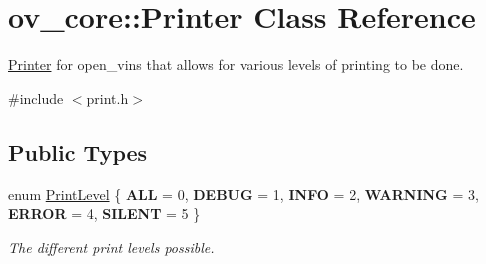 \hypertarget{classov__core_1_1Printer}{}\section{ov\+\_\+core\+:\+:Printer Class Reference}
\label{classov__core_1_1Printer}


\hyperlink{classov__core_1_1Printer}{Printer} for open\+\_\+vins that allows for various levels of printing to be done.  




{\ttfamily \#include $<$print.\+h$>$}

\subsection*{Public Types}
\begin{DoxyCompactItemize}
\item 
enum \hyperlink{classov__core_1_1Printer_a1c4c6c612ec6251afd91a1ddf933a0b2}{Print\+Level} \{ \newline
{\bfseries A\+LL} = 0, 
{\bfseries D\+E\+B\+UG} = 1, 
{\bfseries I\+N\+FO} = 2, 
{\bfseries W\+A\+R\+N\+I\+NG} = 3, 
\newline
{\bfseries E\+R\+R\+OR} = 4, 
{\bfseries S\+I\+L\+E\+NT} = 5
 \}\begin{DoxyCompactList}\small\item\em The different print levels possible. \end{DoxyCompactList}
\end{DoxyCompactItemize}
